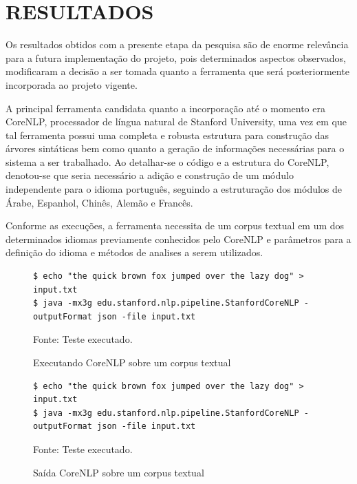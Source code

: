 \chapter{RESULTADOS}
\label{cap:resultados}

Os resultados obtidos com a presente etapa da pesquisa são de enorme relevância para a futura implementação do projeto, pois determinados aspectos observados, modificaram a decisão a ser tomada quanto a ferramenta que será posteriormente incorporada ao projeto vigente.

A principal ferramenta candidata quanto a incorporação até o momento era CoreNLP, processador de língua natural de Stanford University, uma vez em que tal ferramenta possui uma completa e robusta estrutura para construção das árvores sintáticas bem como quanto a geração de informações necessárias para o sistema a ser trabalhado. Ao detalhar-se o código e a estrutura do CoreNLP, denotou-se que seria necessário a adição e construção de um módulo independente para o idioma português, seguindo a estruturação dos módulos de Árabe, Espanhol, Chinês, Alemão e Francês.

Conforme as execuções, a ferramenta necessita de um corpus textual em um dos determinados idiomas previamente conhecidos pelo CoreNLP e parâmetros para a definição do idioma e métodos de analises a serem utilizados.

\begin{figure}[H]
\centering
\caption{Executando CoreNLP sobre um corpus textual} %
\begin{Verbatim}[fontsize=\small]
$ echo "the quick brown fox jumped over the lazy dog" > input.txt
$ java -mx3g edu.stanford.nlp.pipeline.StanfordCoreNLP -outputFormat json -file input.txt
\end{Verbatim} 
{\small Fonte: Teste executado.} %
\label{fig:exemploconfig} %
\end{figure}

\begin{figure}[H]
\centering
\caption{Saída CoreNLP sobre um corpus textual} %
\begin{Verbatim}[fontsize=\small]
$ echo "the quick brown fox jumped over the lazy dog" > input.txt
$ java -mx3g edu.stanford.nlp.pipeline.StanfordCoreNLP -outputFormat json -file input.txt
\end{Verbatim} 
{\small Fonte: Teste executado.} %
\label{fig:exemploconfig} %
\end{figure}

